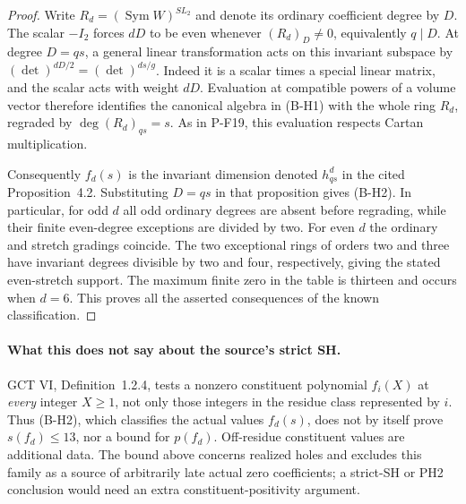 \begin{proof}
Write $R_d=(\operatorname{Sym}W)^{SL_2}$ and denote its ordinary
coefficient degree by $D$. The scalar $-I_2$ forces $dD$ to be
even whenever $(R_d)_D\ne0$, equivalently $q\mid D$.
At degree $D=qs$, a general linear transformation acts on this
invariant subspace by $(\det)^{dD/2}=(\det)^{ds/g}$.
Indeed it is a scalar times a special linear matrix, and the scalar
acts with weight $dD$. Evaluation at compatible powers of a volume
vector therefore identifies the canonical algebra in (B-H1) with
the whole ring $R_d$, regraded by $\deg (R_d)_{qs}=s$.
As in P-F19, this evaluation respects Cartan multiplication.

Consequently $f_d(s)$ is the invariant dimension denoted
$h^d_{qs}$ in the cited Proposition~4.2. Substituting $D=qs$ in
that proposition gives (B-H2). In particular, for odd $d$ all odd
ordinary degrees are absent before regrading, while their finite
even-degree exceptions are divided by two. For even $d$ the
ordinary and stretch gradings coincide. The two exceptional rings
of orders two and three have invariant degrees divisible by two
and four, respectively, giving the stated even-stretch support.
The maximum finite zero in the table is thirteen and occurs when
$d=6$. This proves all the asserted consequences of the known
classification.
\end{proof}

\paragraph{What this does not say about the source's strict SH.}
GCT VI, Definition~1.2.4, tests a nonzero constituent polynomial
$f_i(X)$ at \emph{every} integer $X\ge1$, not only those integers
in the residue class represented by $i$. Thus (B-H2), which
classifies the actual values $f_d(s)$, does not by itself prove
$s(f_d)\le13$, nor a bound for $p(f_d)$. Off-residue constituent
values are additional data. The bound above concerns realized
holes and excludes this family as a source of arbitrarily late
actual zero coefficients; a strict-SH or PH2 conclusion would need
an extra constituent-positivity argument.

